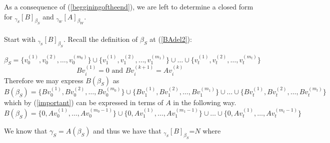 As a consequence of (\ref{begginingoftheend}), we are left to determine a closed form for $_{\gamma_S}[B]_{\beta_S}$ and $_{\gamma_W}[A]_{\beta_W}$.\\\\
Start with $_{\gamma_S}[B]_{\beta_S}$. Recall the definition of $\beta_S$ at (\ref{BAdel2}):

\begin{equation}
    \beta_S=\{v_{0}^{(1)},v_{0}^{(2)},\dots,v_{0}^{(m_0)}\} \cup \{v_{1}^{(1)},v_{1}^{(2)},\dots,v_{1}^{(m_1)}\} \cup \dots \cup \{v_{t}^{(1)},v_{t}^{(2)},\dots,v_{t}^{(m_t)}\}
 \end{equation}
\begin{equation}\label{important}
   Bv_{i}^{(1)}=0 \text{ and } Bv_{i}^{(k+1)}=Av_{i}^{(k)}
\end{equation}
Therefore we may express $B(\beta_S)$ as
\begin{equation}
    B(\beta_S)=\{Bv_{0}^{(1)},Bv_{0}^{(2)},\dots,Bv_{0}^{(m_0)}\} \cup \{Bv_{1}^{(1)},Bv_{1}^{(2)},\dots,Bv_{1}^{(m_1)}\} \cup \dots \cup \{Bv_{t}^{(1)},Bv_{t}^{(2)},\dots,Bv_{t}^{(m_t)}\}
 \end{equation}
which by (\ref{important}) can be expressed in terms of $A$ in the following way.
\begin{equation}
    B(\beta_S)=\{0,Av_{0}^{(1)},\dots,Av_{0}^{(m_0-1)}\} \cup \{0,Av_{1}^{(1)},\dots,Av_{1}^{(m_1-1)}\} \cup \dots \cup \{0,Av_{t}^{(1)},\dots,Av_{t}^{(m_t-1)}\}
 \end{equation}

 We know that $\gamma_S=A(\beta_S)$ and thus we have that $_{\gamma_S}[B]_{\beta_S}$=$N$ where

